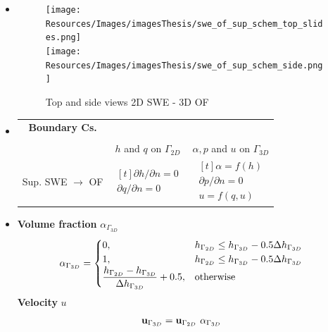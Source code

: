 \begin{frame}
\hspace{-1cm}
\begin{minipage}{0.2\textwidth}
\begin{itemize}
\setlength{\leftmargini}{0pt}
\item<2->[]
\begin{figure}
\texttt{[image: Resources/Images/imagesThesis/swe\_of\_sup\_schem\_top\_slides.png]}\\[0.2cm]
\texttt{[image: Resources/Images/imagesThesis/swe\_of\_sup\_schem\_side.png]}
\caption{Top and side views  2D SWE - 3D OF}
\end{figure}
\end{itemize}
\end{minipage}
\hspace{1cm}
\begin{minipage}{0.3\textwidth}
\vspace{-1.5cm}
\footnotesize
\begin{itemize}
\setlength{\leftmargini}{0pt}
\item<3->[]
\begin{table}[!ht]
\centering
\begin{tabular}{ccc}
\textbf{Boundary Cs.} & & \\ \\ \hline
  &$ h$ and $q$ on $\Gamma_{2D}$ & $\alpha, p$ and $u$ on $\Gamma_{3D}$ \\\hline
Sup. {SWE $\rightarrow$ OF}  & $\begin{aligned}[t] {\partial{h}/\partial{n} = 0} \\ {\partial{q}/\partial{n} = 0} \end{aligned}$                 &  $\begin{aligned}[t] {\alpha = f(h)} \\ {\partial{p}/\partial{n} = 0}  \\ {u = f(q,u)}   \end{aligned}$ 
\end{tabular}
\end{table}
\end{itemize}
\end{minipage}
\hspace{1.7cm}
\begin{minipage}{0.40\textwidth}
\begin{itemize}
\setlength{\leftmargini}{0pt}
\item<4->[]
\small
\textbf{Volume fraction} ${\alpha_{\Gamma_{3D}}}$
\begin{align*}
\alpha_{\Gamma_{3D}} &=  \begin{cases}
	0, &  h_{\Gamma_{2D}} \leq h_{\Gamma_{3D}} - 0.5 \Delta h_{\Gamma_{3D}}\\
	1, &  h_{\Gamma_{2D}} \leq h_{\Gamma_{3D}} - 0.5 \Delta h_{\Gamma_{3D}}\\
	\dfrac{h_{\Gamma_{2D}}-h_{\Gamma_{3D}}}{\Delta h_{\Gamma_{3D}}} + 0.5, & \text{otherwise}
	\end{cases}
\end{align*}
\textbf{Velocity} $u$
\begin{align*}
\mathbf{u}_{\Gamma_{3D}} &= \mathbf{u}_{\Gamma_{2D}} \ \alpha_{\Gamma_{3D}}
\end{align*}
\end{itemize}
\end{minipage}


\end{frame}
